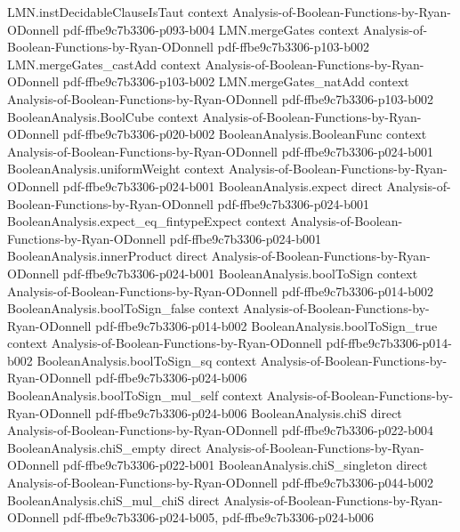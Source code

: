 \begin{lemma}
  {LMN.instDecidableClauseIsTaut}
  {context}
  {Analysis-of-Boolean-Functions-by-Ryan-ODonnell}
  {pdf-ffbe9c7b3306-p093-b004}
\proofstep
  {LMN.mergeGates}
  {context}
  {Analysis-of-Boolean-Functions-by-Ryan-ODonnell}
  {pdf-ffbe9c7b3306-p103-b002}
\proofstep
  {LMN.mergeGates_castAdd}
  {context}
  {Analysis-of-Boolean-Functions-by-Ryan-ODonnell}
  {pdf-ffbe9c7b3306-p103-b002}
\proofstep
  {LMN.mergeGates_natAdd}
  {context}
  {Analysis-of-Boolean-Functions-by-Ryan-ODonnell}
  {pdf-ffbe9c7b3306-p103-b002}
\proofstep
  {BooleanAnalysis.BoolCube}
  {context}
  {Analysis-of-Boolean-Functions-by-Ryan-ODonnell}
  {pdf-ffbe9c7b3306-p020-b002}
\proofstep
  {BooleanAnalysis.BooleanFunc}
  {context}
  {Analysis-of-Boolean-Functions-by-Ryan-ODonnell}
  {pdf-ffbe9c7b3306-p024-b001}
\proofstep
  {BooleanAnalysis.uniformWeight}
  {context}
  {Analysis-of-Boolean-Functions-by-Ryan-ODonnell}
  {pdf-ffbe9c7b3306-p024-b001}
\proofstep
  {BooleanAnalysis.expect}
  {direct}
  {Analysis-of-Boolean-Functions-by-Ryan-ODonnell}
  {pdf-ffbe9c7b3306-p024-b001}
\proofstep
  {BooleanAnalysis.expect_eq_fintypeExpect}
  {context}
  {Analysis-of-Boolean-Functions-by-Ryan-ODonnell}
  {pdf-ffbe9c7b3306-p024-b001}
\proofstep
  {BooleanAnalysis.innerProduct}
  {direct}
  {Analysis-of-Boolean-Functions-by-Ryan-ODonnell}
  {pdf-ffbe9c7b3306-p024-b001}
\proofstep
  {BooleanAnalysis.boolToSign}
  {context}
  {Analysis-of-Boolean-Functions-by-Ryan-ODonnell}
  {pdf-ffbe9c7b3306-p014-b002}
\proofstep
  {BooleanAnalysis.boolToSign_false}
  {context}
  {Analysis-of-Boolean-Functions-by-Ryan-ODonnell}
  {pdf-ffbe9c7b3306-p014-b002}
\proofstep
  {BooleanAnalysis.boolToSign_true}
  {context}
  {Analysis-of-Boolean-Functions-by-Ryan-ODonnell}
  {pdf-ffbe9c7b3306-p014-b002}
\proofstep
  {BooleanAnalysis.boolToSign_sq}
  {context}
  {Analysis-of-Boolean-Functions-by-Ryan-ODonnell}
  {pdf-ffbe9c7b3306-p024-b006}
\proofstep
  {BooleanAnalysis.boolToSign_mul_self}
  {context}
  {Analysis-of-Boolean-Functions-by-Ryan-ODonnell}
  {pdf-ffbe9c7b3306-p024-b006}
\proofstep
  {BooleanAnalysis.chiS}
  {direct}
  {Analysis-of-Boolean-Functions-by-Ryan-ODonnell}
  {pdf-ffbe9c7b3306-p022-b004}
\proofstep
  {BooleanAnalysis.chiS_empty}
  {direct}
  {Analysis-of-Boolean-Functions-by-Ryan-ODonnell}
  {pdf-ffbe9c7b3306-p022-b001}
\proofstep
  {BooleanAnalysis.chiS_singleton}
  {direct}
  {Analysis-of-Boolean-Functions-by-Ryan-ODonnell}
  {pdf-ffbe9c7b3306-p044-b002}
\proofstep
  {BooleanAnalysis.chiS_mul_chiS}
  {direct}
  {Analysis-of-Boolean-Functions-by-Ryan-ODonnell}
  {pdf-ffbe9c7b3306-p024-b005,
    pdf-ffbe9c7b3306-p024-b006}

\end{lemma}
